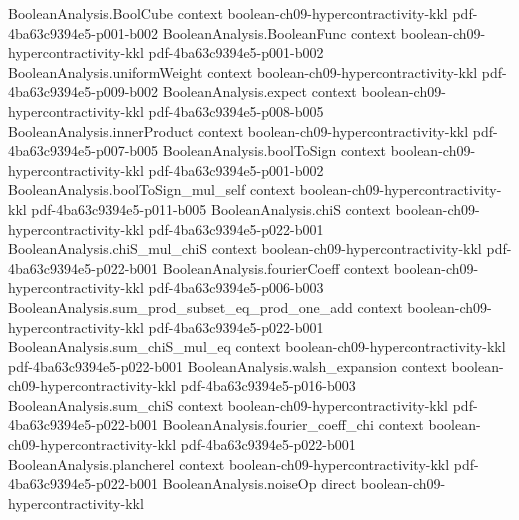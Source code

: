 \begin{theorem}
\label{BooleanAnalysis.Hypercontractivity.hypercontractivity_p_2_general}
\leanok
{}
\proofstep
  {BooleanAnalysis.BoolCube}
  {context}
  {boolean-ch09-hypercontractivity-kkl}
  {pdf-4ba63c9394e5-p001-b002}
\proofstep
  {BooleanAnalysis.BooleanFunc}
  {context}
  {boolean-ch09-hypercontractivity-kkl}
  {pdf-4ba63c9394e5-p001-b002}
\proofstep
  {BooleanAnalysis.uniformWeight}
  {context}
  {boolean-ch09-hypercontractivity-kkl}
  {pdf-4ba63c9394e5-p009-b002}
\proofstep
  {BooleanAnalysis.expect}
  {context}
  {boolean-ch09-hypercontractivity-kkl}
  {pdf-4ba63c9394e5-p008-b005}
\proofstep
  {BooleanAnalysis.innerProduct}
  {context}
  {boolean-ch09-hypercontractivity-kkl}
  {pdf-4ba63c9394e5-p007-b005}
\proofstep
  {BooleanAnalysis.boolToSign}
  {context}
  {boolean-ch09-hypercontractivity-kkl}
  {pdf-4ba63c9394e5-p001-b002}
\proofstep
  {BooleanAnalysis.boolToSign_mul_self}
  {context}
  {boolean-ch09-hypercontractivity-kkl}
  {pdf-4ba63c9394e5-p011-b005}
\proofstep
  {BooleanAnalysis.chiS}
  {context}
  {boolean-ch09-hypercontractivity-kkl}
  {pdf-4ba63c9394e5-p022-b001}
\proofstep
  {BooleanAnalysis.chiS_mul_chiS}
  {context}
  {boolean-ch09-hypercontractivity-kkl}
  {pdf-4ba63c9394e5-p022-b001}
\proofstep
  {BooleanAnalysis.fourierCoeff}
  {context}
  {boolean-ch09-hypercontractivity-kkl}
  {pdf-4ba63c9394e5-p006-b003}
\proofstep
  {BooleanAnalysis.sum_prod_subset_eq_prod_one_add}
  {context}
  {boolean-ch09-hypercontractivity-kkl}
  {pdf-4ba63c9394e5-p022-b001}
\proofstep
  {BooleanAnalysis.sum_chiS_mul_eq}
  {context}
  {boolean-ch09-hypercontractivity-kkl}
  {pdf-4ba63c9394e5-p022-b001}
\proofstep
  {BooleanAnalysis.walsh_expansion}
  {context}
  {boolean-ch09-hypercontractivity-kkl}
  {pdf-4ba63c9394e5-p016-b003}
\proofstep
  {BooleanAnalysis.sum_chiS}
  {context}
  {boolean-ch09-hypercontractivity-kkl}
  {pdf-4ba63c9394e5-p022-b001}
\proofstep
  {BooleanAnalysis.fourier_coeff_chi}
  {context}
  {boolean-ch09-hypercontractivity-kkl}
  {pdf-4ba63c9394e5-p022-b001}
\proofstep
  {BooleanAnalysis.plancherel}
  {context}
  {boolean-ch09-hypercontractivity-kkl}
  {pdf-4ba63c9394e5-p022-b001}
\proofstep
  {BooleanAnalysis.noiseOp}
  {direct}
  {boolean-ch09-hypercontractivity-kkl}

\end{theorem}
